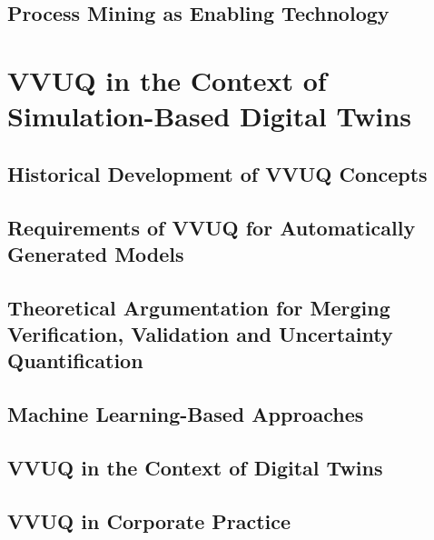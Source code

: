 \subsection{Process Mining as Enabling Technology}



\section{VVUQ in the Context of Simulation-Based Digital Twins}
\label{sec:vvuq-sbdt}


\subsection{Historical Development of VVUQ Concepts}

\subsection{Requirements of VVUQ for Automatically Generated Models}

\subsection{Theoretical Argumentation for Merging Verification, Validation and Uncertainty Quantification}

\subsection{Machine Learning-Based Approaches}

\subsection{VVUQ in the Context of Digital Twins}

\subsection{VVUQ in Corporate Practice}



